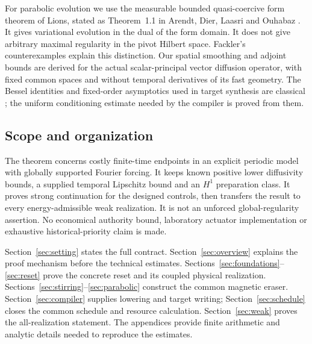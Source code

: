 \documentclass[11pt,a4paper]{amsart}
\theoremstyle{definition}
\theoremstyle{remark}
\numberwithin{equation}{section}
\begin{document}
For parabolic evolution we use the measurable bounded quasi-coercive form theorem of Lions, stated as Theorem~1.1 in Arendt, Dier, Laasri and Ouhabaz \cite{ADLO2014}. It gives variational evolution in the dual of the form domain. It does not give arbitrary maximal regularity in the pivot Hilbert space. Fackler's counterexamples \cite[Theorem~5.1]{Fackler2017} explain this distinction. Our spatial smoothing and adjoint bounds are derived for the actual scalar-principal vector diffusion operator, with fixed common spaces and without temporal derivatives of its fast geometry. The Bessel identities and fixed-order asymptotics used in target synthesis are classical \cite{DLMF}; the uniform conditioning estimate needed by the compiler is proved from them.

\subsection{Scope and organization}
The theorem concerns costly finite-time endpoints in an explicit periodic model with globally supported Fourier forcing. It keeps known positive lower diffusivity bounds, a supplied temporal Lipschitz bound and an $H^1$ preparation class. It proves strong continuation for the designed controls, then transfers the result to every energy-admissible weak realization. It is not an unforced global-regularity assertion. No economical authority bound, laboratory actuator implementation or exhaustive historical-priority claim is made.

Section~\ref{sec:setting} states the full contract. Section~\ref{sec:overview} explains the proof mechanism before the technical estimates. Sections~\ref{sec:foundations}--\ref{sec:reset} prove the concrete reset and its coupled physical realization. Sections~\ref{sec:stirring}--\ref{sec:parabolic} construct the common magnetic eraser. Section~\ref{sec:compiler} supplies lowering and target writing; Section~\ref{sec:schedule} closes the common schedule and resource calculation. Section~\ref{sec:weak} proves the all-realization statement. The appendices provide finite arithmetic and analytic details needed to reproduce the estimates.



\end{document}
